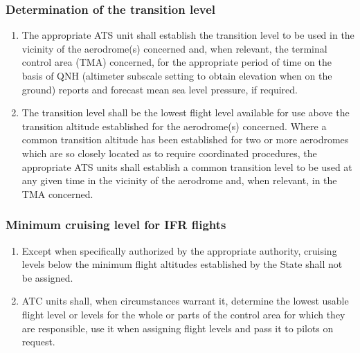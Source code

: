 \subsubsection{Determination of the transition level}

\begin{enumerate}
    \item The appropriate ATS unit shall establish the transition level to be used in the vicinity of the aerodrome(s) concerned and, when relevant, the terminal control area (TMA) concerned, for the appropriate period of time on the basis of QNH (altimeter subscale setting to obtain elevation when on the ground) reports and forecast mean sea level pressure, if required.
    \item The transition level shall be the lowest flight level available for use above the transition altitude established for the aerodrome(s) concerned. Where a common transition altitude has been established for two or more aerodromes which are so closely located as to require coordinated procedures, the appropriate ATS units shall establish a common transition level to be used at any given time in the vicinity of the aerodrome and, when relevant, in the TMA concerned.
\end{enumerate}

\subsubsection{Minimum cruising level for IFR flights}

\begin{enumerate}
    \item Except when specifically authorized by the appropriate authority, cruising levels below the minimum flight altitudes established by the State shall not be assigned.
    \item \label{4.10.3.2} ATC units shall, when circumstances warrant it, determine the lowest usable flight level or levels for the whole or parts of the control area for which they are responsible, use it when assigning flight levels and pass it to pilots on request.
\end{enumerate}


